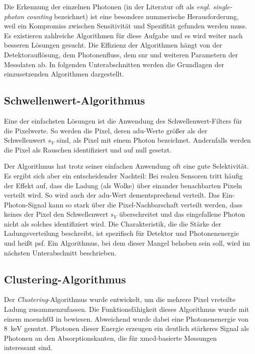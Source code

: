 \noindent
Die Erkennung der einzelnen Photonen (in der Literatur oft als \emph{engl. single-photon counting} bezeichnet) ist eine besondere nummerische Herausforderung, weil ein Kompromiss zwischen Sensitivität und Spezifität gefunden werden muss. Es existieren zahlreiche Algorithmen für diese Aufgabe und es wird weiter nach besseren Lösungen gesucht. Die Effizienz der Algorithmen hängt von der Detektorauflösung, dem Photonenfluss, dem \gls{snr} und weiteren Parametern der Messdaten ab. In folgenden Unterabschnitten werden die Grundlagen der einzusetzenden Algorithmen dargestellt.

\subsection{Schwellenwert-Algorithmus}
\label{text:threshold_algorithm}
Eine der einfachsten Lösungen ist die Anwendung des Schwellenwert-Filters für die Pixelwerte. So werden die Pixel, deren \gls{adu}-Werte größer als der Schwellenwert $s_V$ sind, als Pixel mit einem Photon bezeichnet. Andernfalls werden die Pixel als Rauschen identifiziert und auf null gesetzt.

\noindent
Der Algorithmus hat trotz seiner einfachen Anwendung oft eine gute Selektivität. Es ergibt sich aber ein entscheidender Nachteil: Bei realen Sensoren tritt häufig der Effekt auf, dass die Ladung (als Wolke) über einander benachbarten Pixeln verteilt wird. So wird auch der \gls{adu}-Wert dementsprechend verteilt. Das Ein-Photon-Signal kann so stark über die Pixel-Nachbarschaft verteilt werden, dass keines der Pixel den Schwellenwert $s_V$ überschreitet und das eingefallene Photon nicht als solches identifiziert wird. Die Charakteristik, die die Stärke der Ladungsverteilung beschreibt, ist spezifisch für Detektor und Photonenenergie und heißt \gls{psf}. Ein Algorithmus, bei dem dieser Mangel behoben sein soll, wird im nächsten Unterabschnitt beschrieben.

\subsection{Clustering-Algorithmus}
\label{text:clustering_algorithm}
Der \emph{Clustering}-Algorithmus wurde entwickelt, um die mehrere Pixel vreteilte Ladung zusammenzufassen. Die Funktionsfähigkeit dieses Algorithmus wurde mit einem \gls{moench03} in \cite{cartier_micron_2014} bewiesen. Abweichend wurde dabei eine Photonenenergie von \SI{8}{\kilo\eV} genutzt. Photonen dieser Energie erzeugen ein deutlich stärkeres Signal als Photonen an den Absorptionskanten, die für \gls{xmcd}-basierte Messungen interessant sind.

